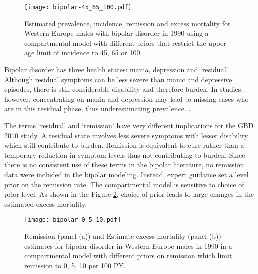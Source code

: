     \begin{figure}[h]
        \begin{center}
            \texttt{[image: bipolar-45\_65\_100.pdf]}
            \caption{Estimated prevalence, incidence, remission and
              excess mortality for Western Europe males with bipolar
              disorder in 1990 using a compartmental model with
              different priors that restrict the upper age limit of
              incidence to 45, 65 or 100.}
            \label{fig:app-bipolar onset}
        \end{center}
    \end{figure}

Bipolar disorder has three health states: mania, depression and
`residual'.  Although residual symptoms can be less severe than manic
and depressive episodes, there is still considerable disability and
therefore burden.  In studies, however, concentrating on mania and
depression may lead to missing cases who are in this residual phase,
thus underestimating prevalence. \cite{angst_historical_2000}.

The terms `residual' and `remission' have very different implications
for the GBD 2010 study.  A residual state involves less severe
symptoms with lesser disability which still contribute to
burden. Remission is equivalent to cure rather than a temporary
reduction in symptom levels thus not contributing to burden. Since
there is no consistent use of these terms in the bipolar literature,
no remission data were included in the bipolar modeling. Instead,
expert guidance set a level prior on the remission rate.  The
compartmental model is sensitive to choice of prior level.  As shown
in the Figure \ref{fig:app-bipolar remission}, choice of prior leads
to large changes in the estimated excess mortality.

    \begin{figure}[h]
        \begin{center}
            \texttt{[image: bipolar-0\_5\_10.pdf]}
            \caption{Remission (panel (a)) and Estimate excess
              mortality (panel (b)) estimates for bipolar disorder in
              Western Europe males in 1990 in a compartmental model
              with different priors on remission which limit remission
              to 0, 5, 10 per 100 PY.}
            \label{fig:app-bipolar remission}
        \end{center}
    \end{figure}

